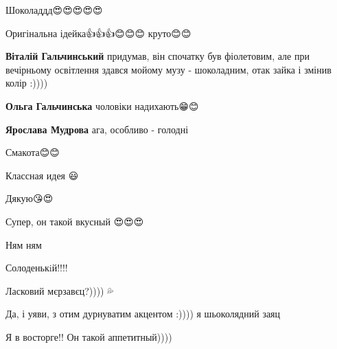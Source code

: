  
 
 
 
 

\qqSecCmt


Шоколаддд😍😍😍😍😍🍫🍫🍫🍫

Оригінальна ідейка👍👍👍😊😊😊 круто😊😊

\begin{itemize} %
\textbf{Віталій Гальчинський} придумав, він спочатку був фіолетовим, але при вечірньому освітлення здався мойому музу - шоколадним, отак зайка і змінив колір :))))

\textbf{Ольга Гальчинська} чоловіки надихають😁😊

\textbf{Ярослава Мудрова} ага, особливо - голодні

Смакота😊😊
\end{itemize} %


Классная идея 😃

\begin{itemize} %
Дякую😘😍
\end{itemize} %


Супер, он такой вкусный 😍😍😍

\begin{itemize} %
Ням ням
\end{itemize} %


Солоденькiй!!!!


Ласковий мєрзавєц?)))) 💦

\begin{itemize} %
Да, і уяви, з отим дурнуватим акцентом :)))) я шьоколядний заяц
\end{itemize} %


Я в восторге!! Он такой аппетитный))))

